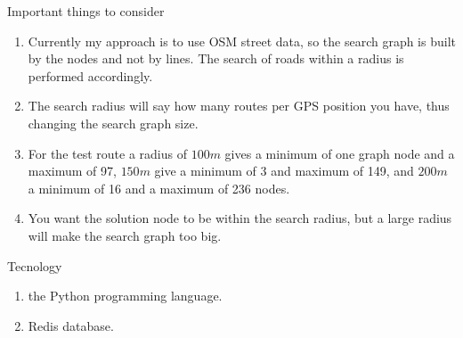 \documentclass[10pt,letterpaper]{article}
\begin{document}
\begin{section}{Important things to consider}
\begin{enumerate}
	\item Currently my approach is to use OSM street data, so the search graph is built by the nodes and not by lines. The search of roads within a radius is performed accordingly.
	\item The search radius will say how many routes per GPS position you have, thus changing the search graph size.
	\item For the test route a radius of $100m$ gives a minimum of one graph node and a maximum of 97, $150m$ give a minimum of 3 and maximum of 149, and $200m$ a minimum of 16 and a maximum of 236 nodes.
	\item You want the solution node to be within the search radius, but a large radius will make the search graph too big.
\end{enumerate}
\end{section}

\begin{section}{Tecnology}

\begin{enumerate}
	\item the Python programming language.

	\item Redis database.
\end{enumerate}

\end{section}
\end{document}
